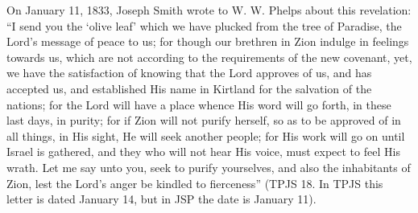 		On January 11, 1833, Joseph Smith wrote to W. W. Phelps about this revelation: ``I send you the `olive leaf' which we have plucked from the tree of Paradise, the Lord's message of peace to us; for though our brethren in Zion indulge in feelings towards us, which are not according to the requirements of the new covenant, yet, we have the satisfaction of knowing that the Lord approves of us, and has accepted us, and established His name in Kirtland for the salvation of the nations; for the Lord will have a place whence His word will go forth, in these last days, in purity; for if Zion will not purify herself, so as to be approved of in all things, in His sight, He will seek another people; for His work will go on until Israel is gathered, and they who will not hear His voice, must expect to feel His wrath. Let me say unto you, seek to purify yourselves, and also the inhabitants of Zion, lest the Lord's anger be kindled to fierceness'' (TPJS 18. In TPJS this letter is dated January 14, but in JSP the date is January 11).
	
